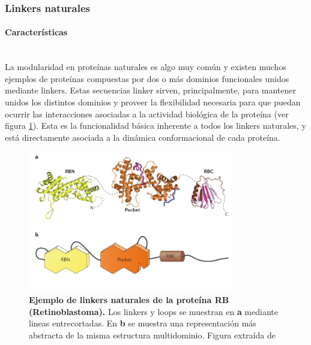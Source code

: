 
\subsubsection{Linkers naturales}


\paragraph{Características} \hspace{0pt} \\ \indent 
La modularidad en proteínas naturales es algo muy común y existen muchos ejemplos de proteínas compuestas por dos o más dominios funcionales unidos mediante linkers.
Estas secuencias linker sirven, principalmente, para mantener unidos los distintos dominios y proveer la flexibilidad necesaria para que puedan ocurrir las interacciones asociadas a la actividad biológica de la proteína
(ver figura \ref{multidomainRb}). Esta es la funcionalidad básica inherente a todos los linkers naturales, y está directamente asociada a la dinámica conformacional de cada proteína. 


\begin{figure}[ht]
\centering
\includegraphics[width=0.8\textwidth]{img/multidomainRb.png} 
\caption{\textbf{Ejemplo de linkers naturales de la proteína RB (Retinoblastoma).} Los linkers y loops se muestran en \textbf{a} mediante lineas entrecortadas. 
En \textbf{b} se muestra una representación más abstracta de la misma estructura multidominio. Figura extraída de \cite{dick2013molecular}} 
\label{multidomainRb}
\end{figure}

